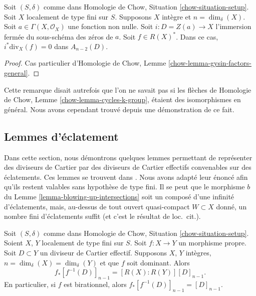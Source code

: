 \begin{lemma}
\label{lemma-gysin-factors-principal}
Soit $(S, \delta)$ comme dans Homologie de Chow, Situation \ref{chow-situation-setup}.
Soit $X$ localement de type fini sur $S$.
Supposons $X$ intègre et $n = \dim_\delta(X)$.
Soit $a \in \Gamma(X, \mathcal{O}_X)$ une fonction non nulle.
Soit $i : D = Z(a) \to X$ l'immersion fermée du sous-schéma des zéros de $a$.
Soit $f \in R(X)^*$.
Dans ce cas, $i^*\text{div}_X(f) = 0$ dans $A_{n - 2}(D)$.
\end{lemma}

\begin{proof}
Cas particulier d'Homologie de Chow, Lemme \ref{chow-lemma-gysin-factors-general}.
\end{proof}

\begin{remark}
\label{remark-not-true-not-quasi-compact}
Cette remarque disait autrefois que l'on ne savait pas si les flèches de
Homologie de Chow, Lemme \ref{chow-lemma-cycles-k-group}, étaient des isomorphismes
en général. Nous avons cependant trouvé depuis une démonstration de ce fait.
\end{remark}







\subsection{Lemmes d'éclatement}
\label{section-blowing-up-lemmas}

\noindent
Dans cette section, nous démontrons quelques lemmes permettant de représenter
des diviseurs de Cartier par des diviseurs de Cartier effectifs convenables
sur des éclatements. Ces lemmes se trouvent dans \cite[section 2.4]{F}.
Nous avons adapté leur énoncé afin qu'ils restent valables
sans hypothèse de type fini. Il se peut que le morphisme $b$
du Lemme \ref{lemma-blowing-up-intersections} soit un composé
d'une infinité d'éclatements, mais, au-dessus de tout ouvert quasi-compact
$W \subset X$ donné, un nombre fini d'éclatements suffit
(et c'est le résultat de loc.\ cit.).

\begin{lemma}
\label{lemma-push-pull-effective-Cartier}
Soit $(S, \delta)$ comme dans Homologie de Chow, Situation \ref{chow-situation-setup}.
Soient $X$, $Y$ localement de type fini sur $S$.
Soit $f : X \to Y$ un morphisme propre.
Soit $D \subset Y$ un diviseur de Cartier effectif.
Supposons $X$, $Y$ intègres, $n = \dim_\delta(X) = \dim_\delta(Y)$ et
que $f$ soit dominant. Alors
$$
f_*[f^{-1}(D)]_{n - 1} = [R(X) : R(Y)] [D]_{n - 1}.
$$
En particulier, si $f$ est birationnel, alors $f_*[f^{-1}(D)]_{n - 1} = [D]_{n - 1}$.
\end{lemma}

